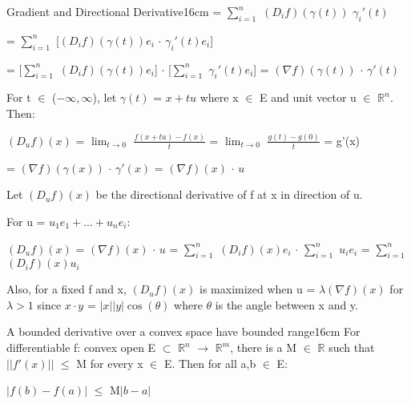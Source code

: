 \begin{definition}{Gradient and Directional Derivative}{16cm}
        \hspace{2.15cm}
        = $\sum_{i=1}^n$ $(D_if)(\gamma(t))$ $\gamma_i'(t)$

        \hspace{2.15cm}
        = $\sum_{i=1}^n$ [$(D_if)(\gamma(t))e_i$ $\cdot$ $\gamma_i'(t)e_i$]

        \hspace{2.15cm}
        = [$\sum_{i=1}^n$ $(D_if)(\gamma(t))e_i$]
        $\cdot$ [$\sum_{i=1}^n$ $\gamma_i'(t)e_i$]
        = $(\nabla f)(\gamma(t))$ $\cdot$ $\gamma'(t)$

        For t $\in$ ($-\infty,\infty$), let $\gamma(t)$ = $x + tu$
        where x $\in$ E and unit vector u $\in$ $\mathbb{R}^n$. Then:

        \hspace{0.5cm}
        $(D_uf)(x)$
        = $\lim_{t \rightarrow 0}$ $\frac{f(x+tu) - f(x)}{t}$
        = $\lim_{t \rightarrow 0}$ $\frac{g(t) - g(0)}{t}$
        = g'(x)

        \hspace{2.3cm}
        = $(\nabla f)(\gamma(x))$ $\cdot$ $\gamma'(x)$
        = $(\nabla f)(x)$ $\cdot$ $u$

        Let $(D_uf)(x)$ be the {\color{lblue} directional derivative}
        of f at x in direction of u.

        For u = $u_1e_1 + ... + u_ne_i$:

        \hspace{0.5cm}
        $(D_uf)(x)$
        = $(\nabla f)(x)$ $\cdot$ $u$
        = $\sum_{i=1}^n$ $(D_if)(x)e_i$ $\cdot$ $\sum_{i=1}^n$ $u_ie_i$
        = $\sum_{i=1}^n$ $(D_if)(x)u_i$

        \vspace{0.3cm}

        Also, for a fixed f and x, $(D_uf)(x)$ is maximized when
        u = $\lambda (\nabla f)(x)$ for $\lambda > 1$
        since $x \cdot y$ = $|x| |y| \cos(\theta)$ where $\theta$ is the angle
        between x and y.
    \end{definition}

    \newpage



    \begin{wtheorem}{A bounded derivative over a convex space
    have bounded range}{16cm}
        For differentiable f: convex open E $\subset$ $\mathbb{R}^n$
        $\rightarrow$ $\mathbb{R}^m$, there is a M $\in$ $\mathbb{R}$ such that
        $||f'(x)||$ $\leq$ M for every x $\in$ E. Then for all a,b $\in$ E:
        
        \hspace{0.5cm}
        $|f(b) - f(a)|$ $\leq$ M$|b-a|$
    \end{wtheorem}


